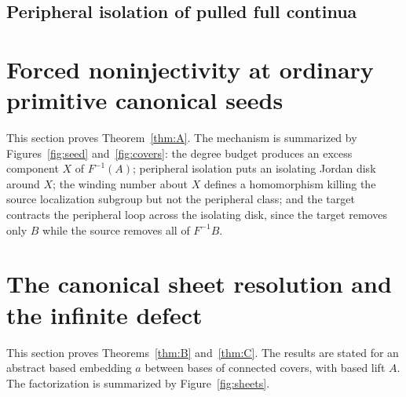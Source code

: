 \documentclass[11pt,reqno]{amsart}
\theoremstyle{definition}
\theoremstyle{remark}
\begin{document}
\subsection{Peripheral isolation of pulled full continua}

\section{Forced noninjectivity at ordinary primitive canonical seeds}
\label{sec:forced}




This section proves Theorem~\ref{thm:A}.  The mechanism is summarized
by Figures~\ref{fig:seed} and~\ref{fig:covers}: the degree budget
produces an excess component $X$ of $F^{-1}(A)$; peripheral isolation
puts an isolating Jordan disk around $X$; the winding number about $X$
defines a homomorphism killing the source localization subgroup but not
the peripheral class; and the target contracts the peripheral loop
across the isolating disk, since the target removes only $B$ while the
source removes all of $F^{-1}B$.




\section{The canonical sheet resolution and the infinite defect}
\label{sec:resolution}



This section proves Theorems~\ref{thm:B} and~\ref{thm:C}.  The results
are stated for an abstract based embedding $a$ between bases of
connected covers, with based lift $A$.  The factorization is summarized
by Figure~\ref{fig:sheets}.
\end{document}
